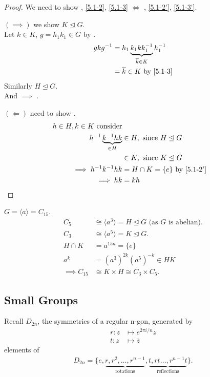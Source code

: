 \begin{proof}
  We need to show , \ref{5.1-2}, \ref{5.1-3} $\iff$ , \ref{5.1-2'}, \ref{5.1-3'}.

  $(\implies)$ we show $K \trianglelefteq G$.\\
  Let $k \in K$, $g = h_1 k_1 \in G$ by .
  \begin{align*}
    g k g^{-1} &= h_1 \underbrace{k_1 k k_1^{-1}}_{\overline{k} \in K} h_1^{-1} \\
    &= \overline{k} \in K \text{ by } \Cref{5.1-3}
  \end{align*} 
  Similarly $H \trianglelefteq G$. \\
  And  $\implies$ .

  $(\Longleftarrow)$ need to show .
  \begin{align*}
    h \in H, k \in K \text{ consider} \\
    h^{-1} \underbrace{k^{-1} h k}_{\in H} &\in H, \text{ since } H \trianglelefteq G \\
    &\in K, \text{ since } K \trianglelefteq G \\
    \implies h^{-1}k^{-1} h k &= H \cap K = \{ e \} \text{ by \Cref{5.1-2'}} \\
    \implies hk &= kh 
  \end{align*} 
\end{proof} 

\begin{example}
$G = \langle a \rangle = C_{15}$.
  \begin{align*}
    C_5 &\cong \langle a^3 \rangle = H \trianglelefteq G \text{ (as $G$ is abelian)}. \\
    C_3 &\cong \langle a^5 \rangle = K \trianglelefteq G. \\
    H \cap K &= a^{15n} = \{ e \} \\
    a^k &= (a^3)^{2k} (a^5)^{-k} \in HK \\
    \implies C_{15} &\cong K \times H \cong C_3 \times C_5.
  \end{align*} 
\end{example} 

\subsection{Small Groups}

Recall $D_{2n}$, the symmetries of a regular n-gon, generated by 
\begin{align*}
  r : z &\mapsto e^{2 \pi i / n} z \\
  t : z &\mapsto \overline{z} 
\end{align*} 
elements of \begin{align*}
  D_{2n} = \{e, \underbrace{r, r^2, \ldots, r^{n-1}}_\text{rotations}, \underbrace{t, rt \ldots, r^{n-1}t}_\text{reflections} \}.
\end{align*}

